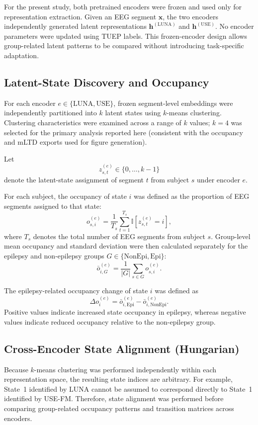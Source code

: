 For the present study, both pretrained encoders were frozen and used only for
representation extraction. Given an EEG segment $\mathbf{x}$, the two encoders
independently generated latent representations
$\mathbf{h}^{(\mathrm{LUNA})}$ and $\mathbf{h}^{(\mathrm{USE})}$.
No encoder parameters were updated using TUEP labels. This frozen-encoder
design allows group-related latent patterns to be compared without introducing
task-specific adaptation.


\subsection{Latent-State Discovery and Occupancy}

For each encoder $e \in \{\mathrm{LUNA},\mathrm{USE}\}$, frozen segment-level
embeddings were independently partitioned into $k$ latent states using
$k$-means clustering. Clustering characteristics were examined across a range
of $k$ values; $k=4$ was selected for the primary analysis reported here
(consistent with the occupancy and mLTD exports used for figure generation).

Let
\[
z_{s,t}^{(e)} \in \{0,\ldots,k-1\}
\]
denote the latent-state assignment of segment $t$ from subject $s$ under
encoder $e$.

For each subject, the occupancy of state $i$ was defined as the proportion of
EEG segments assigned to that state:
\[
o_{s,i}^{(e)}
=
\frac{1}{T_s}
\sum_{t=1}^{T_s}
\mathbb{I}\left[z_{s,t}^{(e)}=i\right],
\]
where $T_s$ denotes the total number of EEG segments from subject $s$.
Group-level mean occupancy and standard deviation were then calculated
separately for the epilepsy and non-epilepsy groups $G \in \{\mathrm{NonEpi},\mathrm{Epi}\}$:
\[
\bar{o}_{i,G}^{(e)}
=
\frac{1}{|G|}
\sum_{s\in G}
o_{s,i}^{(e)}.
\]

The epilepsy-related occupancy change of state $i$ was defined as
\[
\Delta o_i^{(e)}
=
\bar{o}_{i,\mathrm{Epi}}^{(e)}
-
\bar{o}_{i,\mathrm{NonEpi}}^{(e)}.
\]
Positive values indicate increased state occupancy in epilepsy, whereas
negative values indicate reduced occupancy relative to the non-epilepsy group.


\subsection{Cross-Encoder State Alignment (Hungarian)}

Because $k$-means clustering was performed independently within each
representation space, the resulting state indices are arbitrary. For example,
State~1 identified by LUNA cannot be assumed to correspond directly to State~1
identified by USE-FM. Therefore, state alignment was performed before comparing
group-related occupancy patterns and transition matrices across encoders.

